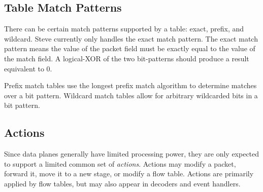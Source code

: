 \subsection{Table Match Patterns} \label{tut:match_patterns}

There can be certain match patterns supported by a table: exact, prefix, and wildcard. Steve currently only handles the exact match pattern. The exact match pattern means the value of the packet field must be exactly equal to the value of the match field. A logical-XOR of the two bit-patterns should produce a result equivalent to 0.

Prefix match tables use the longest prefix match algorithm to determine
matches over a bit pattern.
Wildcard match tables allow for arbitrary wildcarded bits in a bit pattern.

\subsection{Actions} \label{action_desc}

Since data planes generally have limited processing power, they are only
expected to support a limited common set of \emph{actions}.
Actions may modify a packet, forward it, move it to a new stage, or modify a
flow table. 
Actions are primarily applied by flow tables, but may also appear in decoders
and event handlers.


